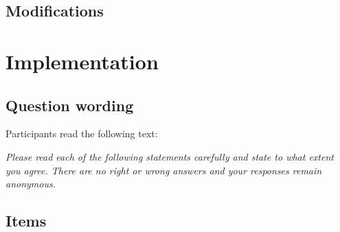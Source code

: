 \documentclass[
  letterpaper,
]{scrbook}
\begin{document}
\subsection*{Modifications}\label{modifications-18}

\section{Implementation}\label{implementation-21}

\subsection*{Question wording}\label{question-wording-18}

Participants read the following text:

\emph{Please read each of the following statements carefully and state
to what extent you agree. There are no right or wrong answers and your
responses remain anonymous.}

\subsection{Items}\label{items-18}
\end{document}
